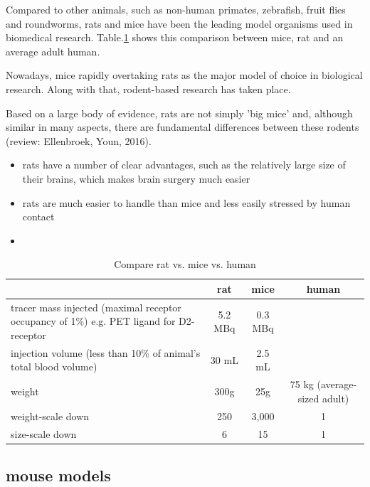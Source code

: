 Compared to other animals, such as non-human primates, zebrafish, fruit flies
and roundworms, rats and mice have been the leading model organisms used in
biomedical research. Table.\ref{tab:mice-rat-human} shows this comparison
between mice, rat and an average adult human.

Nowadays, mice rapidly overtaking rats as the major model of choice in
biological research. Along with that, rodent-based research has taken place.

Based on a large body of evidence, rats are not simply 'big mice' and, although
similar in many aspects, there are fundamental differences between these
rodents (review: Ellenbroek, Youn, 2016).
\begin{itemize}
  \item  rats have a number of clear advantages, such as the relatively large
  size of their brains, which makes brain surgery much easier 
  
  \item rats are much easier to handle than mice and less easily stressed by
  human contact
  
  \item 
\end{itemize}


\begin{table}[hbt]
\begin{center}
    \begin{tabular}{p{5cm}ccc}
        \hline
        & rat &  mice & human \\
        \hline \hline
tracer mass injected (maximal receptor occupancy of 1\%)
e.g. PET ligand for D2-receptor &  5.2 MBq & 0.3 MBq & \\
injection volume (less than 10\% of animal's 
total blood volume) & 30 mL & 2.5 mL & \\
weight & 300g & 25g & 75 kg (average-sized adult) \\
weight-scale down & 250 & 3,000 & 1 \\
size-scale down & 6 & 15 & 1  \\
        \hline
    \end{tabular}
\end{center}
\caption{Compare rat vs. mice vs. human}
\label{tab:mice-rat-human}
\end{table}


\subsection{mouse models}
\label{sec:mouse-models}

